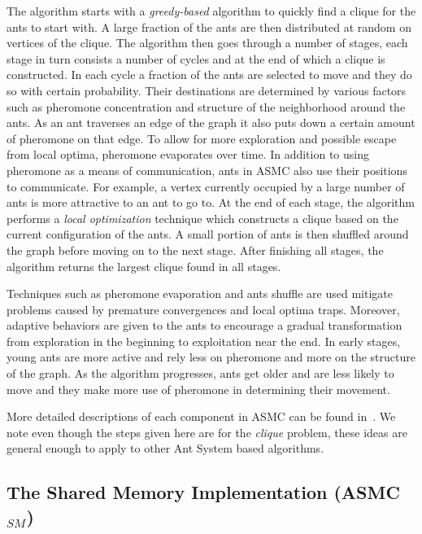 \documentclass[11pt]{article}
\begin{document}
The algorithm starts with a \textit{greedy-based} algorithm to quickly find a clique for the ants to start with.  A large fraction of the ants are then distributed at random on vertices of the clique.  The algorithm then goes through a number of stages, each stage in turn consists a number of cycles and at the end of which a clique is constructed. In each cycle a fraction of the ants are selected to move and they do so with certain probability.  Their destinations are determined by various factors such as pheromone concentration and structure of the neighborhood around the ants.  As an ant traverses an edge of the graph it also puts down a certain amount of pheromone on that edge.  To allow for more exploration and possible escape from local optima, pheromone evaporates over time.  In addition to using pheromone as a means of communication, ants in ASMC also use their positions to communicate.  For example, a vertex currently occupied by a large number of ants is more attractive to an ant to go to. At the end of each stage, the algorithm performs a \textit{local optimization} technique which constructs a clique based on the current configuration of the ants. A small portion of ants is then shuffled around the graph before moving on to the next stage. After finishing all stages, the algorithm returns the largest clique found in all stages. %


Techniques such as pheromone evaporation and ants shuffle are used mitigate problems caused by premature convergences and local optima traps. Moreover, adaptive behaviors are given to the ants to encourage a gradual transformation from exploration in the beginning to exploitation near the end. In early stages, young ants are more active and rely less on pheromone and more on the structure of the graph.  As the algorithm progresses, ants get older and are less likely to move and they make more use of pheromone in determining their movement.

More detailed descriptions of each component in ASMC can be found in~\cite{BR}. We note even though the steps given here are for the \textit{clique} problem, these ideas are general enough to apply to other Ant System based algorithms. 

\subsection{The Shared Memory Implementation (ASMC$_{SM}$)}\label{ASMC_sm}
\end{document}
